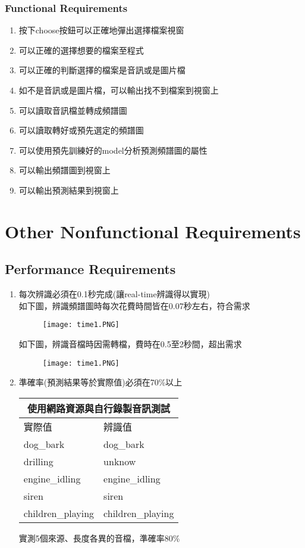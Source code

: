 \documentclass{scrreprt}
\begin{document}
\begin{CJK*}{UTF8}{bsmi}
\subsection{Functional Requirements}
\begin{enumerate}
\item 按下choose按鈕可以正確地彈出選擇檔案視窗
\item 可以正確的選擇想要的檔案至程式
\item 可以正確的判斷選擇的檔案是音訊或是圖片檔
\item 如不是音訊或是圖片檔，可以輸出找不到檔案到視窗上
\item 可以讀取音訊檔並轉成頻譜圖
\item 可以讀取轉好或預先選定的頻譜圖
\item 可以使用預先訓練好的model分析預測頻譜圖的屬性
\item 可以輸出頻譜圖到視窗上
\item 可以輸出預測結果到視窗上
\end{enumerate}
\chapter{Other Nonfunctional Requirements}
\section{Performance Requirements}
\begin{enumerate}
\item 每次辨識必須在0.1秒完成(讓real-time辨識得以實現)\\
如下圖，辨識頻譜圖時每次花費時間皆在0.07秒左右，符合需求
\begin{figure}[H]
\centering
\texttt{[image: time1.PNG]}
\end{figure}
如下圖，辨識音檔時因需轉檔，費時在0.5至2秒間，超出需求
\begin{figure}[H]
\centering
\texttt{[image: time1.PNG]}
\end{figure}
\item 準確率(預測結果等於實際值)必須在70\%以上
\begin{center}
\begin{tabular}{|l|l|}
\hline \multicolumn{2}{|c|}{使用網路資源與自行錄製音訊測試} \\\hline
實際值  & 辨識值  \\ \hline
dog_bark  & dog_bark  \\ \hline
drilling  & unknow  \\ \hline
engine_idling  & engine_idling  \\ \hline
siren  & siren  \\ \hline
children_playing  &children_playing   \\ \hline
\end{tabular}
\end{center}
實測5個來源、長度各異的音檔，準確率80\%
\end{enumerate}


\end{CJK*}
\end{document}
